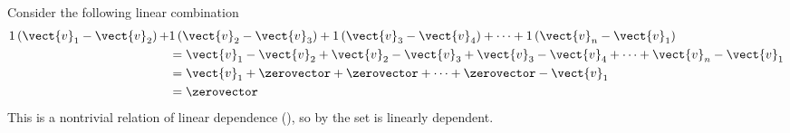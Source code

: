 Consider the following linear combination
%
\begin{align*}
1\left(\vect{v}_1-\vect{v}_2\right)+&
1\left(\vect{v}_2-\vect{v}_3\right)+
1\left(\vect{v}_3-\vect{v}_4\right)+\cdots+
1\left(\vect{v}_n-\vect{v}_1\right)\\
&=
\vect{v}_1-\vect{v}_2+
\vect{v}_2-\vect{v}_3+
\vect{v}_3-\vect{v}_4+\dots+
\vect{v}_n-\vect{v}_1\\
&=\vect{v}_1+\zerovector+\zerovector+\cdots+\zerovector-\vect{v}_1\\
&=\zerovector
\end{align*}
%
This is a nontrivial relation of linear dependence (), so by  the set is linearly dependent.